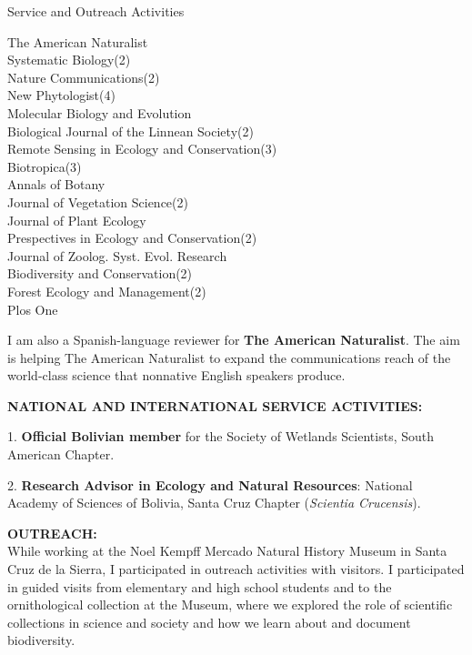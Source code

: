\documentclass{resume} %
\begin{document}
\begin{rSection}{Service and Outreach Activities}
\begin{multicols}{2}
The American Naturalist \\ 
Systematic Biology(2) \\
Nature Communications(2) \\
New Phytologist(4) \\ 
Molecular Biology and Evolution \\ 
Biological Journal of the Linnean Society(2) \\
Remote Sensing in Ecology and Conservation(3) \\ 
Biotropica(3) \\ 
Annals of Botany \\ 
Journal of Vegetation Science(2) \\ 
Journal of Plant Ecology \\ 
Prespectives in Ecology and Conservation(2) \\
Journal of Zoolog. Syst. Evol. Research \\
Biodiversity and Conservation(2) \\
Forest Ecology and Management(2) \\
Plos One \smallskip

\end{multicols}

I am also a Spanish-language reviewer for {\bf The American Naturalist}. The aim is helping The American Naturalist to expand the communications reach of the world-class science that nonnative English speakers produce.

\textbf{NATIONAL AND INTERNATIONAL SERVICE ACTIVITIES:} \smallskip 

\item 1. \textbf{Official Bolivian member} for the Society of Wetlands Scientists, South American Chapter. 

\item 2. \textbf{Research Advisor in Ecology and Natural Resources}: National Academy of Sciences of Bolivia, Santa Cruz Chapter ({\em Scientia Crucensis}). 

\textbf{OUTREACH:} \smallskip \\ 
While working at the Noel Kempff Mercado Natural History Museum in Santa Cruz de la Sierra, I participated in outreach activities with visitors. I participated in guided visits from elementary and high school students and to the ornithological collection at the Museum, where we explored the role of scientific collections in science and society and how we learn about and document biodiversity.


\end{rSection}
\end{document}
